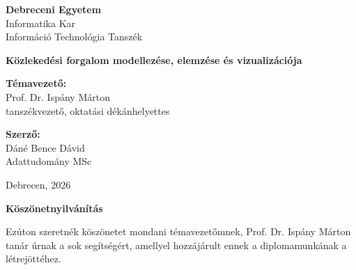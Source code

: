 \documentclass[14pt,a4paper]{extarticle}
\begin{document}

\thispagestyle{empty}

\vspace*{1cm}
\begin{center}
    \Large \textbf{Debreceni Egyetem} \\
    \large Informatika Kar \\
    \normalsize Információ Technológia Tanszék
\end{center}

\vspace{4cm}

\begin{center}
    \LARGE \textbf{ Közlekedési forgalom modellezése, elemzése és vizualizációja } \\
    \vspace{0.5cm}
\end{center}

\vspace{7cm}

\begin{minipage}[t]{0.45\textwidth}
    \raggedright
    \textbf{Témavezető:} \\    
Prof. Dr. Ispány Márton
 \\
    tanszékvezető, oktatási dékánhelyettes 
\end{minipage}
\hfill
\begin{minipage}[t]{0.45\textwidth}
    \raggedleft
    \textbf{Szerző:} \\
    Dáné Bence Dávid \\
    Adattudomány MSc
\end{minipage}

\vfill

\begin{center}
    Debrecen, 2026
\end{center}

\newpage

\newpage
\thispagestyle{plain}
\begin{center}
    \huge \textbf{Köszönetnyilvánítás}
\end{center}

\vspace{1cm}

Ezúton szeretnék köszönetet mondani témavezetőmnek, Prof. Dr. Ispány Márton tanár úrnak a sok segítségért, amellyel hozzájárult ennek a diplomamunkának a létrejöttéhez.
\end{document}
